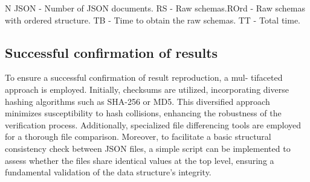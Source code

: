 \documentclass[sigconf, nonacm]{acmart}
\begin{document}
\begin{table}[ht]
  \centering
  \caption{Comparison With Wang et al \cite{wang2015schema}}
  \vspace{-10pt}
  \label{tab:example}
  \smallskip
  \vspace{1pt}
  \parbox{0.4\textwidth}{%
    \centering
    \raggedright
    \footnotesize
    N JSON - Number of JSON documents. RS - Raw schemas.\newline ROrd - Raw schemas with ordered structure. TB - Time to obtain the raw schemas. TT - Total time.
  }
        \label{table1}

\end{table}

\subsection{Successful confirmation of results}

To ensure a successful confirmation of result reproduction, a mul- tifaceted approach is employed. Initially, checksums are utilized, incorporating diverse hashing algorithms such as SHA-256 or MD5. This diversified approach minimizes susceptibility to hash collisions, enhancing the robustness of the verification process. Additionally, specialized file differencing tools are employed for a thorough file comparison. Moreover, to facilitate a basic structural consistency check between JSON files, a simple script can be implemented to assess whether the files share identical values at the top level, ensuring a fundamental validation of the data structure’s integrity.





\end{document}
